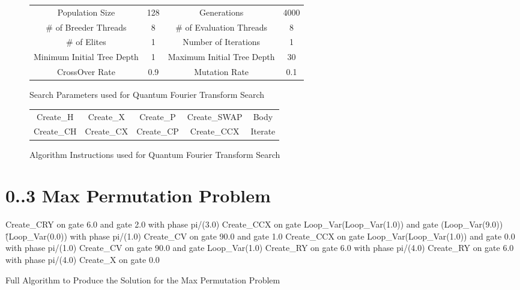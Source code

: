 \begin{figure}[h!]
\begin{center}
 \begin{tabular}{|cc|cc|}
\hline
  Population Size & 128 & Generations & 4000 \\
  \# of Breeder Threads & 8 & \# of Evaluation Threads & 8 \\
  \# of Elites & 1 & Number of Iterations & 1 \\
  Minimum Initial Tree Depth & 1 & Maximum Initial Tree Depth & 30 \\
  CrossOver Rate & 0.9 & Mutation Rate & 0.1 \\
\hline
 \end{tabular}

\end{center}
\caption{Search Parameters used for Quantum Fourier Transform Search}
\label{fig:qftparams}
\end{figure}

\begin{figure}[h!]
\begin{center}
 \begin{tabular}{|ccccc|}
\hline
  Create\_H & Create\_X & Create\_P & Create\_SWAP & Body \\
  Create\_CH & Create\_CX & Create\_CP & Create\_CCX & Iterate \\
\hline
 \end{tabular}
\end{center}
\caption{Algorithm Instructions used for Quantum Fourier Transform Search}
\label{fig:qftgates}
\end{figure}

\clearpage
\section{0..3 Max Permutation Problem}

\begin{algorithm}
 \begin{algorithmic}
\STATE Create\_CRY on gate 6.0 and gate 2.0 with phase pi/(3.0)
\STATE Create\_CCX on gate Loop\_Var(Loop\_Var(1.0)) and gate (Loop\_Var(9.0))\^(Loop\_Var(0.0)) with phase pi/(1.0)
\STATE Create\_CV on gate 90.0 and gate 1.0
\STATE Create\_CCX on gate Loop\_Var(Loop\_Var(1.0)) and gate 0.0 with phase pi/(1.0)
\STATE Create\_CV on gate 90.0 and gate Loop\_Var(1.0)
\STATE Create\_RY on gate 6.0 with phase pi/(4.0)
\STATE Create\_RY on gate 6.0 with phase pi/(4.0)
\STATE Create\_X on gate 0.0
 \end{algorithmic}
\caption{Full Algorithm to Produce the Solution for the Max Permutation Problem}
\label{alg:03permfullalg}
\end{algorithm}

